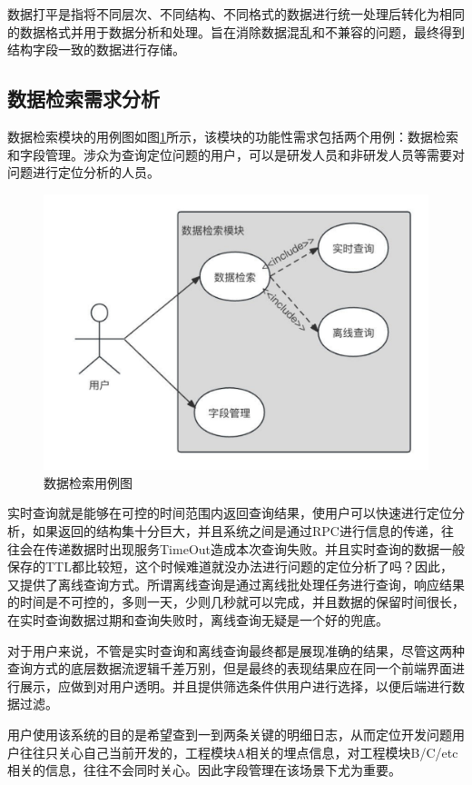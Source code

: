 数据打平是指将不同层次、不同结构、不同格式的数据进行统一处理后转化为相同的数据格式并用于数据分析和处理。旨在消除数据混乱和不兼容的问题，最终得到结构字段一致的数据进行存储。

\subsection{数据检索需求分析}
数据检索模块的用例图如图\ref{datachuli}所示，该模块的功能性需求包括两个用例：数据检索和字段管理。涉众为查询定位问题的用户，可以是研发人员和非研发人员等需要对问题进行定位分析的人员。
\begin{figure}[htb]
  \centering
  \includegraphics[width=5in]{figure/chapter3/数据检索用例图.pdf}
  \caption{数据检索用例图}\label{datachuli}
\end{figure}

实时查询就是能够在可控的时间范围内返回查询结果，使用户可以快速进行定位分析，如果返回的结构集十分巨大，并且系统之间是通过RPC进行信息的传递，往往会在传递数据时出现服务TimeOut造成本次查询失败。并且实时查询的数据一般保存的TTL都比较短，这个时候难道就没办法进行问题的定位分析了吗？因此，又提供了离线查询方式。所谓离线查询是通过离线批处理任务进行查询，响应结果的时间是不可控的，多则一天，少则几秒就可以完成，并且数据的保留时间很长，在实时查询数据过期和查询失败时，离线查询无疑是一个好的兜底。
    
对于用户来说，不管是实时查询和离线查询最终都是展现准确的结果，尽管这两种查询方式的底层数据流逻辑千差万别，但是最终的表现结果应在同一个前端界面进行展示，应做到对用户透明。并且提供筛选条件供用户进行选择，以便后端进行数据过滤。

用户使用该系统的目的是希望查到一到两条关键的明细日志，从而定位开发问题用户往往只关心自己当前开发的，工程模块A相关的埋点信息，对工程模块B/C/etc相关的信息，往往不会同时关心。因此字段管理在该场景下尤为重要。


